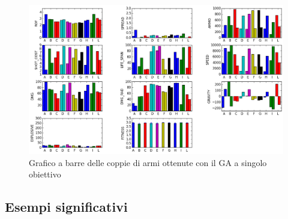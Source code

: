 \documentclass[12pt, italian]{toptesi}
\begin{document}
\begin{figure}[tp]
\centering
\includegraphics[width=1.2\textwidth, angle=90]{bar_single_obj}
\caption{Grafico a barre delle coppie di armi ottenute con il GA a singolo obiettivo}
\label{fig:cluster_single_obj_1}
\end{figure}

\subsection{Esempi significativi}
\label{sec:esempi_single_obj}
\end{document}
